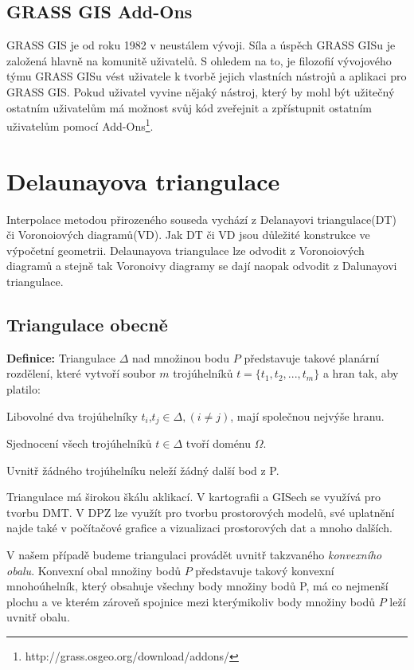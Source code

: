 \documentclass[12pt,a4paper]{article}
\begin{document}
\subsection{GRASS GIS Add-Ons}
GRASS GIS je od roku 1982 v neustálem vývoji. Síla a úspěch GRASS GISu je založená hlavně na komunitě uživatelů. S ohledem na to, je filozofií vývojového týmu GRASS GISu vést uživatele k tvorbě jejich vlastních nástrojů a aplikaci pro GRASS GIS. Pokud uživatel vyvine nějaký nástroj, který by mohl být užitečný ostatním uživatelům má možnost svůj kód zveřejnit a zpřístupnit ostatním uživatelům pomocí Add-Ons\footnote{http://grass.osgeo.org/download/addons/}.

\newpage
\section{Delaunayova triangulace}
Interpolace metodou přirozeného souseda vychází z Delanayovi triangulace(DT) či Voronoiových diagramů(VD). Jak DT či VD jsou důležité konstrukce ve výpočetní geometrii. Delaunayova triangulace lze odvodit z Voronoiových diagramů a stejně tak Voronoivy diagramy se dají naopak odvodit z Dalunayovi triangulace.

\subsection{Triangulace obecně}
\textbf{Definice:}
Triangulace $\Delta$ nad množinou bodu $P$ představuje takové planární rozdělení, které vytvoří soubor $m$ trojúhelníků $t = \{ t_1, t_2,...,t_m \}$ a hran tak, aby platilo:

Libovolné dva trojúhelníky $t_i$,$t_j \in \Delta, (i \neq j)$, mají společnou nejvýše hranu.

Sjednocení všech trojúhelníků $t \in \Delta$ tvoří doménu $\Omega$.

Uvnitř žádného trojúhelníku neleží žádný další bod z P.

\bigskip
Triangulace má širokou škálu aklikací. V kartografii a GISech se využívá pro tvorbu DMT. V DPZ lze využít pro tvorbu prostorových modelů, své uplatnění najde také v počítačové grafice a vizualizaci prostorových dat a mnoho dalších.

V našem případě budeme triangulaci provádět uvnitř takzvaného \textit{konvexního obalu}. Konvexní obal množiny bodů $P$ představuje takový konvexní mnohoúhelník, který obsahuje všechny body množiny bodů P, má co nejmenší plochu a ve kterém zároveň spojnice mezi kterýmikoliv body množiny bodů $P$ leží uvnitř obalu.
\end{document}
